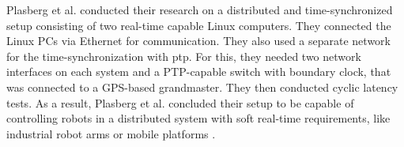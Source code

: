Plasberg et al. conducted their research on a distributed and time-synchronized setup consisting of two real-time capable Linux computers. They connected the Linux PCs via Ethernet for communication. They also used a separate network for the time-synchronization with \gls{ptp}. For this, they needed two network interfaces on each system and a PTP-capable switch with boundary clock, that was connected to a GPS-based grandmaster. They then conducted cyclic latency tests. As a result, Plasberg et al. concluded their setup to be capable of controlling robots in a distributed system with soft real-time requirements, like industrial robot arms or mobile platforms \cite{plasberg_towards_2022}.



